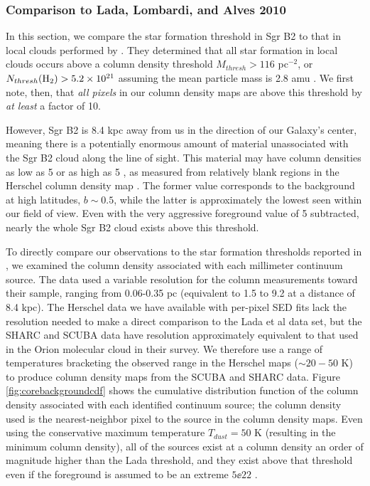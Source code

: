 \documentclass[twocolumn]{aastex61}
\newcommand{\dsgrb}{8.4 kpc\xspace}
\begin{document}
\subsubsection{Comparison to Lada, Lombardi, and Alves 2010}
In this section, we compare the star formation threshold in Sgr B2 to that in
local clouds performed by \citet{Lada2010a}.  They determined that all star
formation in local clouds occurs above a column density threshold $M_{thresh} >
116$ \msun pc$^{-2}$, or $N_{thresh}(\textrm{H}_{2}) > 5.2\times10^{21}$ \persc assuming the
mean particle mass is 2.8 amu \citep{Kauffmann2008a}.  We first note, then,
that \emph{all pixels} in our column density maps are above this threshold
by \emph{at least} a factor of 10.

However, Sgr B2 is \dsgrb away from us in the direction of our Galaxy's
center, meaning there is a potentially enormous amount of material unassociated
with the Sgr B2 cloud along the line of sight.  This material may have column
densities as low as
5 \persc or as high as 5 \persc, as measured from relatively
blank regions in the Herschel column density map \citep{Battersby2011a}.  The
former value corresponds to
the background at high latitudes, $b\sim0.5$, while the latter  is
approximately the lowest seen within our field of view. 
Even with the very aggressive foreground value of 5 \persc subtracted,
nearly the whole Sgr B2 cloud exists above this threshold.

To directly compare our observations to the star formation thresholds reported
in \citet{Lada2010a}, we examined the column density associated with each
millimeter continuum source.  The \citet{Lada2010a} data used a variable
resolution for the column measurements toward their sample, ranging from
0.06-0.35 pc (equivalent to 1.5 to 9.2 \arcsec at a distance of \dsgrb).  The
Herschel data we have available with per-pixel SED fits lack the resolution
needed to make a direct comparison to the Lada et al data set, but the SHARC
and SCUBA data have resolution approximately equivalent to that used in the
Orion molecular cloud in their survey.  We therefore use a range of temperatures
bracketing the observed range in the Herschel maps ($\sim20-50$ K) to produce
column density maps from the SCUBA and SHARC data.  Figure
\ref{fig:corebackgroundcdf} shows the cumulative distribution function of the
column density associated with each identified continuum source; the column
density used is the nearest-neighbor pixel to the source in the column density
maps.  Even using the conservative maximum temperature $T_{dust}=50$ K
(resulting in the minimum column density), all of the sources exist at a column
density an order of magnitude higher than the Lada threshold, and they exist
above that threshold even if the foreground is assumed to be an extreme $5\ee{22}$
\persc.
\end{document}
